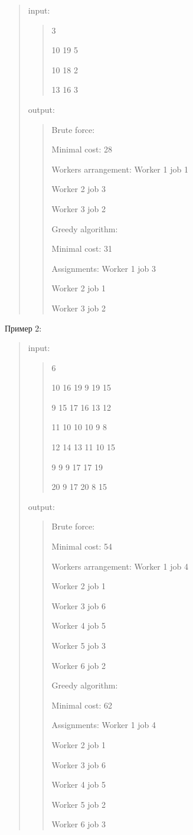 \documentclass[]{article}
\begin{document}
\begin{quote}
input:
\begin{quote}
3

10 19 5

10 18 2

13 16 3
\end{quote}
output:
\begin{quote}
Brute force:

Minimal cost: 28

Workers arrangement: Worker 1 job 1

Worker 2 job 3

Worker 3 job 2

Greedy algorithm:

Minimal cost: 31

Assignments: Worker 1 job 3

Worker 2 job 1

Worker 3 job 2
\end{quote}
\end{quote}
Пример 2:
\begin{quote}
input:

\begin{quote}
6

10 16 19 9 19 15

9 15 17 16 13 12

11 10 10 10 9 8

12 14 13 11 10 15

9 9 9 17 17 19

20 9 17 20 8 15
\end{quote}
output:
\begin{quote}
Brute force:

Minimal cost: 54

Workers arrangement: Worker 1 job 4

Worker 2 job 1

Worker 3 job 6

Worker 4 job 5

Worker 5 job 3

Worker 6 job 2

Greedy algorithm:

Minimal cost: 62

Assignments: Worker 1 job 4

Worker 2 job 1

Worker 3 job 6

Worker 4 job 5

Worker 5 job 2

Worker 6 job 3
\end{quote}
\end{quote}
\end{document}
